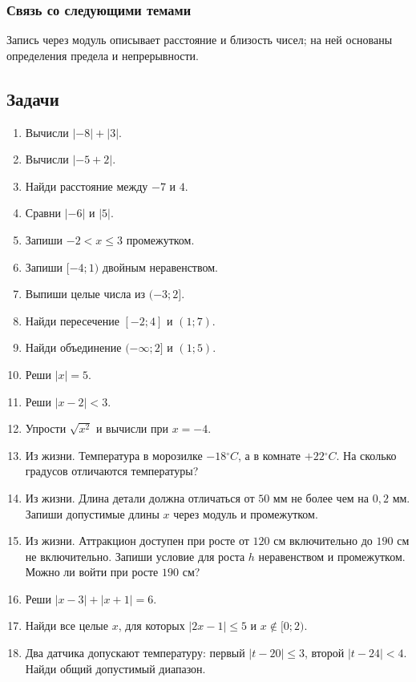 \documentclass[12pt,a4paper]{article}
\theoremstyle{definition}
\theoremstyle{plain}
\theoremstyle{remark}
\newcommand{\starmark}{\ensuremath{{}^{\ast}}}
\begin{document}
\subsubsection*{Связь со следующими темами}
Запись через модуль описывает расстояние и близость чисел; на ней основаны определения предела и непрерывности.
\subsection*{Задачи}
\begin{enumerate}[label=\thesection.\arabic*.,leftmargin=2.8em,itemsep=12pt]
\item Вычисли \(| - 8 | + | 3 |\).
\item Вычисли \(| - 5 + 2 |\).
\item Найди расстояние между \(- 7\) и \(4\).
\item Сравни \(| - 6 |\) и \(| 5 |\).
\item Запиши \(- 2 < x \le  3\) промежутком.
\item Запиши \([- 4;\allowbreak 1)\) двойным неравенством.
\item Выпиши целые числа из \((- 3;\allowbreak 2]\).
\item Найди пересечение \([- 2;\allowbreak 4]\) и \((1;\allowbreak 7)\).
\item Найди объединение \((- \infty ;\allowbreak 2]\) и \((1;\allowbreak 5)\).
\item Реши \(| x | = 5\).
\item Реши \(| x - 2 | < 3\).
\item Упрости \(\sqrt{x^{2}}\) и вычисли при \(x = - 4\).
\item Из жизни. Температура в морозилке \(- 18 {}^{\circ} C\), а в комнате \(+ 22 {}^{\circ} C\). На сколько градусов отличаются температуры?
\item Из жизни. Длина детали должна отличаться от \(50\) мм не более чем на \(0{,}2\) мм. Запиши допустимые длины \(x\) через модуль и промежутком.
\item Из жизни. Аттракцион доступен при росте от \(120\) см включительно до \(190\) см не включительно. Запиши условие для роста \(h\) неравенством и промежутком. Можно ли войти при росте \(190\) см?
\item[\textbf{8.16.}\starmark] Реши \(| x - 3 | + | x + 1 | = 6\).
\item[\textbf{8.17.}\starmark] Найди все целые \(x\), для которых \(| 2 x - 1 | \le  5\) и \(x \notin  [0;\allowbreak 2)\).
\item[\textbf{8.18.}\starmark] Два датчика допускают температуру: первый \(| t - 20 | \le  3\), второй \(| t - 24 | < 4\). Найди общий допустимый диапазон.
\end{enumerate}
\clearpage
\end{document}
